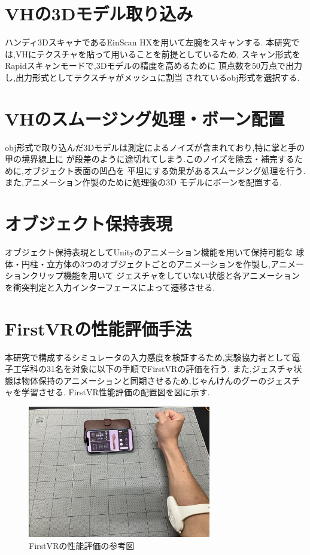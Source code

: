 \documentclass{ltjsreport}
\begin{document}
	\section{VHの3Dモデル取り込み}
		ハンディ3DスキャナであるEinScan HXを用いて左腕をスキャンする.
		本研究では,VHにテクスチャを貼って用いることを前提としているため,
		スキャン形式をRapidスキャンモードで,3Dモデルの精度を高めるために
		頂点数を50万点で出力し,出力形式としてテクスチャがメッシュに割当
		されているobj形式を選択する.

	\section{VHのスムージング処理・ボーン配置}
		obj形式で取り込んだ3Dモデルは測定によるノイズが含まれており,特に掌と手の甲の境界線上に
		が段差のように途切れてしまう.このノイズを除去・補完するために,オブジェクト表面の凹凸を
		平坦にする効果があるスムージング処理を行う.また,アニメーション作製のために処理後の3D
		モデルにボーンを配置する.

	\section{オブジェクト保持表現}
		オブジェクト保持表現としてUnityのアニメーション機能を用いて保持可能な
		球体・円柱・立方体の3つのオブジェクトごとのアニメーションを作製し,アニメーションクリップ機能を用いて
		ジェスチャをしていない状態と各アニメーションを衝突判定と入力インターフェースによって遷移させる.

	\section{FirstVRの性能評価手法}
		本研究で構成するシミュレータの入力感度を検証するため,実験協力者として電子工学科の31名を対象に以下の手順でFirstVRの評価を行う.
		また,ジェスチャ状態は物体保持のアニメーションと同期させるため,じゃんけんのグーのジェスチャを学習させる.
		FirstVR性能評価の配置図を図に示す.
		\begin{figure}[H]
			\centering
			\includegraphics[width = 8cm]{../figs/IMG_5202.PNG}
			\caption{FirstVRの性能評価の参考図}
			\label{fig:firstVRtest}
		\end{figure}
		\vspace{-15pt}
\end{document}
